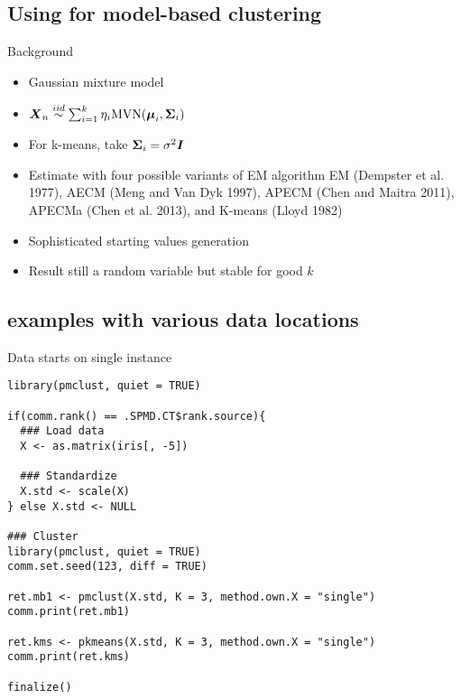 \subsection{Using \protect{} for model-based clustering}
\makesubcontentsslidessec

\begin{frame}[fragile]
  \begin{block}{Background}
    \begin{itemize}
    \item Gaussian mixture model
    \item  $\boldsymbol{X}_n \overset{iid}{\sim} \sum_{i=1}^k
      \eta_i \mbox{MVN}(\boldsymbol{\mu}_i, \boldsymbol{\Sigma}_i)$
    \item For k-means, take $\boldsymbol{\Sigma}_i = \sigma^2\boldsymbol{I}$
    \item Estimate with four possible variants of EM algorithm EM (Dempster et al. 1977),
      AECM (Meng and Van Dyk 1997), APECM (Chen and Maitra 2011), APECMa (Chen et al.
      2013), and K-means (Lloyd 1982)
    \item Sophisticated starting values generation
    \item Result still a random variable but stable for good $k$
    \end{itemize}
  \end{block}
\end{frame}

\subsection{\protect{} examples with various data locations}

\begin{frame}[fragile]
  \begin{exampleblock}{Data starts on single instance}\pause
    \begin{lstlisting}[title=iris\_single.r]
library(pmclust, quiet = TRUE)

if(comm.rank() == .SPMD.CT$rank.source){
  ### Load data
  X <- as.matrix(iris[, -5])

  ### Standardize
  X.std <- scale(X)
} else X.std <- NULL

### Cluster
library(pmclust, quiet = TRUE)
comm.set.seed(123, diff = TRUE)

ret.mb1 <- pmclust(X.std, K = 3, method.own.X = "single")
comm.print(ret.mb1)

ret.kms <- pkmeans(X.std, K = 3, method.own.X = "single")
comm.print(ret.kms)

finalize()
    \end{lstlisting} %
  \end{exampleblock}
\end{frame}

